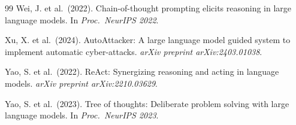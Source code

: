 \documentclass[12pt,a4paper,oneside,openany]{book}
\begin{document}
\begin{thebibliography}{99}
Wei, J. et al.\ (2022).
Chain-of-thought prompting elicits reasoning in large language models.
In \textit{Proc.\ NeurIPS 2022}.

Xu, X. et al.\ (2024).
AutoAttacker: A large language model guided system to implement automatic cyber-attacks.
\textit{arXiv preprint arXiv:2403.01038}.

Yao, S. et al.\ (2022).
ReAct: Synergizing reasoning and acting in language models.
\textit{arXiv preprint arXiv:2210.03629}.

Yao, S. et al.\ (2023).
Tree of thoughts: Deliberate problem solving with large language models.
In \textit{Proc.\ NeurIPS 2023}.

\end{thebibliography}
\end{document}
